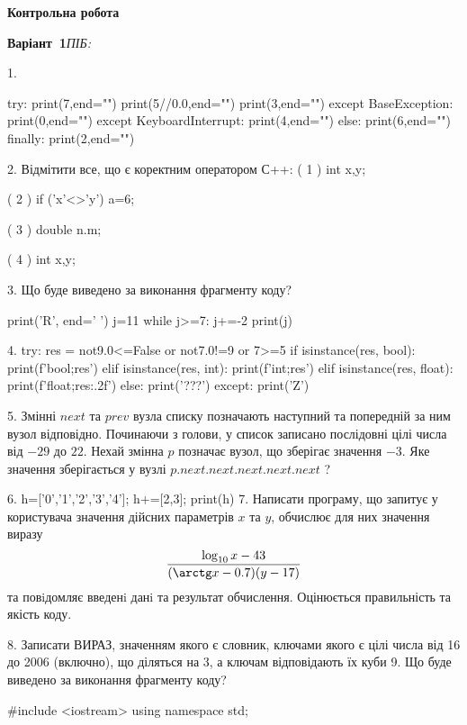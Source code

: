 \documentclass[11pt]{article}
\begin{document}
{\large\textbf{Контрольна робота}}

\textbf{Варіант \No\,1}\hfill \textit{ПІБ:}\,\underline{\hspace{60mm}}
\vspace{4mm}

1. 

try:
    print(7,end="")
    print(5//0.0,end="")
    print(3,end="")
except BaseException: print(0,end="")
except KeyboardInterrupt: print(4,end="")
else: print(6,end="")
finally: print(2,end="")

2. %
Відмітити все, що є коректним оператором С++:
( 1 ) int x,y;

( 2 ) if ('x'<>'y') a=6;

( 3 ) double n.m;

( 4 ) {int x,y;}

3. Що буде виведено за виконання фрагменту коду?

print('R', end=' ')
j=11
while j>=7:
    j+=-2
print(j)


4. 
try:
    res = not9.0<=False or not7.0!=9 or 7>=5
    if isinstance(res, bool):
        print(f'bool;{res}')
    elif isinstance(res, int):
        print(f'int;{res}')
    elif isinstance(res, float):
        print(f'float;{res:.2f}')
    else:
        print('???')
except:
    print('Z')

5. 
Змінні $next$ та $prev$ вузла списку позначають наступний та попередній за ним вузол відповідно. Починаючи з голови, у список записано послідовні цілі числа від $-29$ до $22$. Нехай змінна $p$ позначає вузол, що зберігає значення $-3$.
Яке значення зберігається у вузлі $p.next.next.next.next.next$ ?

6. 
h=['0','1','2','3','4']; h+=[2,3]; print(h)
7. 
Написати програму, що запитує у користувача значення дійсних параметрів $x$ та $y$, обчислює для них значення виразу 
$$\frac{\log_{10} x - 43}{(\arctg x - 0.7) (y - 17)}$$ 
та повiдомляє введенi данi та результат обчислення.
 Оцінюється правильність та якість коду.


8. 
Записати ВИРАЗ, значенням якого є словник, ключами якого є цілі числа від 16 до 2006 (включно), що діляться на 3, а ключам відповідають їх куби 
9. Що буде виведено за виконання фрагменту коду?

#include <iostream>
using namespace std;
\end{document}
